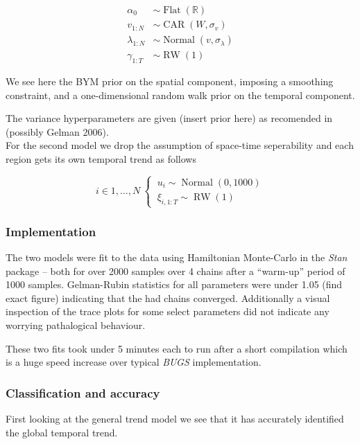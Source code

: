 \documentclass{article}
\begin{document}
\begin{align}
\alpha_0 &\sim \operatorname{Flat}(\mathbb{R}) \\
v_{1:N} &\sim \operatorname{CAR}(W, \sigma_v) \\
\lambda_{1:N} &\sim \operatorname{Normal}(v, \sigma_\lambda) \\
\gamma_{1:T} &\sim \operatorname{RW}(1)
\end{align}

We see here the BYM prior on the spatial component, imposing a smoothing constraint, and a one-dimensional random walk prior on the temporal component. 

The variance hyperparameters are given (insert prior here) as recomended in (possibly Gelman 2006). \\

For the second model we drop the assumption of space-time seperability and each region gets its own temporal trend as follows

\begin{equation}
i \in 1,\ldots,N \
\begin{cases}
\ u_i \sim \operatorname{Normal}(0, 1000) \\
\ \xi_{i, 1:T} \sim \operatorname{RW}(1) 
\end{cases}
\end{equation}

\subsubsection{Implementation}

The two models were fit to the data using Hamiltonian Monte-Carlo in the \emph{Stan} package -- both for over 2000 samples over 4 chains after a ``warm-up'' period of 1000 samples. Gelman-Rubin statistics for all parameters were under 1.05 (find exact figure) indicating that the had chains converged. Additionally a visual inspection of the trace plots for some select parameters did not indicate any worrying pathalogical behaviour.

These two fits took under 5 minutes each to run after a short compilation which is a huge speed increase over typical \emph{BUGS} implementation.

\subsubsection{Classification and accuracy}

First looking at the general trend model we see that it has accurately identified the global temporal trend. 
\end{document}
